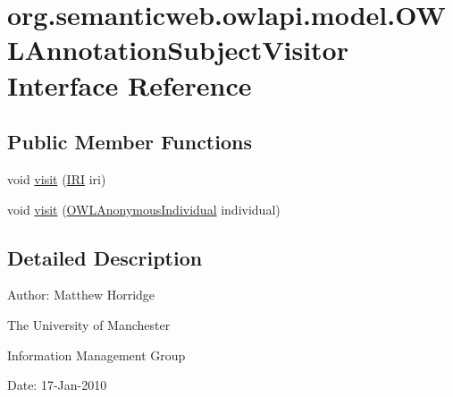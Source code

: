 \hypertarget{interfaceorg_1_1semanticweb_1_1owlapi_1_1model_1_1_o_w_l_annotation_subject_visitor}{\section{org.\-semanticweb.\-owlapi.\-model.\-O\-W\-L\-Annotation\-Subject\-Visitor Interface Reference}
\label{interfaceorg_1_1semanticweb_1_1owlapi_1_1model_1_1_o_w_l_annotation_subject_visitor}
}
\subsection*{Public Member Functions}
\begin{DoxyCompactItemize}
\item 
void \hyperlink{interfaceorg_1_1semanticweb_1_1owlapi_1_1model_1_1_o_w_l_annotation_subject_visitor_a5ca79b5cc7e2ff6a0c234eaf80d5bdcb}{visit} (\hyperlink{classorg_1_1semanticweb_1_1owlapi_1_1model_1_1_i_r_i}{I\-R\-I} iri)
\item 
void \hyperlink{interfaceorg_1_1semanticweb_1_1owlapi_1_1model_1_1_o_w_l_annotation_subject_visitor_ad8680a1f5f9b69fbda3b7839632f52ec}{visit} (\hyperlink{interfaceorg_1_1semanticweb_1_1owlapi_1_1model_1_1_o_w_l_anonymous_individual}{O\-W\-L\-Anonymous\-Individual} individual)
\end{DoxyCompactItemize}


\subsection{Detailed Description}
Author\-: Matthew Horridge\par
 The University of Manchester\par
 Information Management Group\par
 Date\-: 17-\/\-Jan-\/2010 

